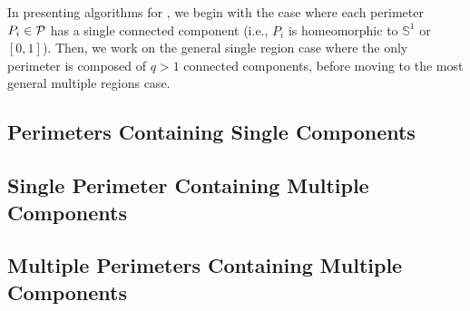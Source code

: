 \def\algoMRSimple{{\sc MultiRegionSingleComp}\xspace}
\def\algoSRG{{\sc SingleRegionMultiComp}\xspace}
\def\algoMRG{{\sc MultiRegionMultiComp}\xspace}
\def\isLFeasible{{\sc IsFeasible}}
\def\isLFeasibleByTilingPartial{{\sc IsTilingFeasiblePartial}}
\def\isLFeasibleByTilingFull{{\sc IsTilingFeasibleFull}}
%
In presenting algorithms for \opg, we begin with the case 
where each perimeter $P_i \in \P$ has a single connected component 
(i.e., $P_i$ is homeomorphic to $\mathbb S^1$ or $[0, 1]$). Then, 
we work on the general single region case where the only perimeter 
is composed of $q > 1$ connected components, before moving to the 
most general multiple regions case.

\subsection{Perimeters Containing Single Components}


\subsection{Single Perimeter Containing Multiple Components}


\vspace*{-2mm}
\subsection{Multiple Perimeters Containing Multiple Components}
\vspace*{-1mm}


